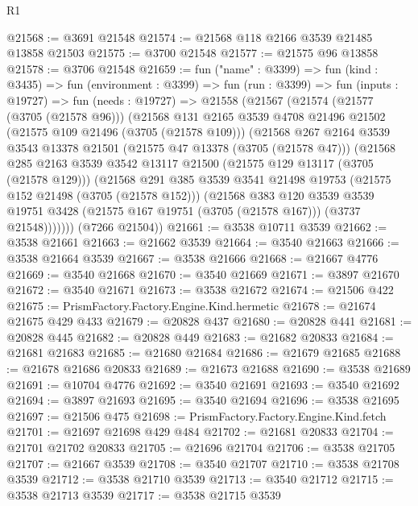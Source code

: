 \begin{lexlean}{R1}
\begin{coremodule}
@21568 := @3691 @21548
@21574 := @21568 @118 @2166 @3539 @21485 @13858 @21503
@21575 := @3700 @21548
@21577 := @21575 @96 @13858
@21578 := @3706 @21548
@21659 := fun ("name" : @3399) =>
  fun (kind : @3435) =>
  fun (environment : @3399) =>
  fun (run : @3399) =>
  fun (inputs : @19727) =>
  fun (needs : @19727) =>
  @21558
    (@21567
      (@21574
        (@21577 (@3705 (@21578 @96)))
        (@21568
          @131
          @2165
          @3539
          @4708
          @21496
          @21502
          (@21575 @109 @21496 (@3705 (@21578 @109)))
          (@21568
            @267
            @2164
            @3539
            @3543
            @13378
            @21501
            (@21575 @47 @13378 (@3705 (@21578 @47)))
            (@21568
              @285
              @2163
              @3539
              @3542
              @13117
              @21500
              (@21575 @129 @13117 (@3705 (@21578 @129)))
              (@21568
                @291
                @385
                @3539
                @3541
                @21498
                @19753
                (@21575 @152 @21498 (@3705 (@21578 @152)))
                (@21568
                  @383
                  @120
                  @3539
                  @3539
                  @19751
                  @3428
                  (@21575 @167 @19751 (@3705 (@21578 @167)))
                  (@3737 @21548)))))))
      (@7266 @21504))
@21661 := @3538 @10711 @3539
@21662 := @3538 @21661
@21663 := @21662 @3539
@21664 := @3540 @21663
@21666 := @3538 @21664 @3539
@21667 := @3538 @21666
@21668 := @21667 @4776
@21669 := @3540 @21668
@21670 := @3540 @21669
@21671 := @3897 @21670
@21672 := @3540 @21671
@21673 := @3538 @21672
@21674 := @21506 @422
@21675 := PrismFactory.Factory.Engine.Kind.hermetic
@21678 := @21674 @21675 @429 @433
@21679 := @20828 @437
@21680 := @20828 @441
@21681 := @20828 @445
@21682 := @20828 @449
@21683 := @21682 @20833
@21684 := @21681 @21683
@21685 := @21680 @21684
@21686 := @21679 @21685
@21688 := @21678 @21686 @20833
@21689 := @21673 @21688
@21690 := @3538 @21689
@21691 := @10704 @4776
@21692 := @3540 @21691
@21693 := @3540 @21692
@21694 := @3897 @21693
@21695 := @3540 @21694
@21696 := @3538 @21695
@21697 := @21506 @475
@21698 := PrismFactory.Factory.Engine.Kind.fetch
@21701 := @21697 @21698 @429 @484
@21702 := @21681 @20833
@21704 := @21701 @21702 @20833
@21705 := @21696 @21704
@21706 := @3538 @21705
@21707 := @21667 @3539
@21708 := @3540 @21707
@21710 := @3538 @21708 @3539
@21712 := @3538 @21710 @3539
@21713 := @3540 @21712
@21715 := @3538 @21713 @3539
@21717 := @3538 @21715 @3539

\end{coremodule}
\end{lexlean}
